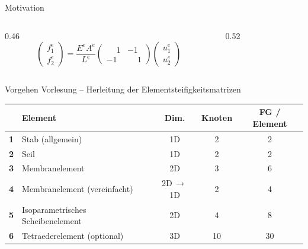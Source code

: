 \documentclass[aspectratio=169,professionalfonts]{beamer}
\newcommand{\mat}[1]{\underline{\underline{#1}}}
\begin{document}
\begin{frame}{Motivation}
  \begin{columns}[T,onlytextwidth]
    \begin{column}{0.46\textwidth}
      \centering
      \[
        \begin{pmatrix}f_1^e\\f_2^e\end{pmatrix}
        =\frac{E^e A^e}{L^e}
        \begin{pmatrix}\phantom{-}1&-1\\-1&\phantom{-}1\end{pmatrix}
        \begin{pmatrix}u_1^e\\u_2^e\end{pmatrix}
      \]
    \end{column}
    \begin{column}{0.52\textwidth}
      \centering\small
      \onslide<2->{%
      \[
        \mathbf{f}^e
        =
        \underbrace{\mat{k}^e}_{\in\,\mathbb{R}^{30\times 30}}
        \mathbf{u}^e
        \quad
        \mat{k}^e =
        \begin{pmatrix}
          K_{11}&\cdots&K_{1,30}\\
          \vdots&\ddots&\vdots\\
          K_{30,1}&\cdots&K_{30,30}
        \end{pmatrix}
      \]
      }%
    \end{column}
  \end{columns}

\end{frame}

\begin{frame}{Vorgehen Vorlesung – Herleitung der Elementsteifigkeitsmatrizen}
  \centering\small
  \begin{tabular}{@{}clccc@{}}
    \toprule
    & \textbf{Element} & \textbf{Dim.} & \textbf{Knoten} & \textbf{FG / Element} \\
    \midrule
    \textbf{1} & Stab (allgemein)                      & 1D             & 2  & 2  \\[0.3em]
    \textbf{2} & Seil                                & 1D             & 2  & 2  \\[0.3em]
    \textbf{3} & Membranelement                      & 2D             & 3  & 6  \\[0.3em]
    \textbf{4} & Membranelement (vereinfacht)        & 2D\,$\to$\,1D  & 2  & 4  \\[0.3em]
    \textbf{5} & Isoparametrisches Scheibenelement   & 2D             & 4  & 8  \\[0.3em]
    \textbf{6} & Tetraederelement (optional)         & 3D             & 10 & 30 \\
    \bottomrule
  \end{tabular}
\end{frame}
\end{document}
